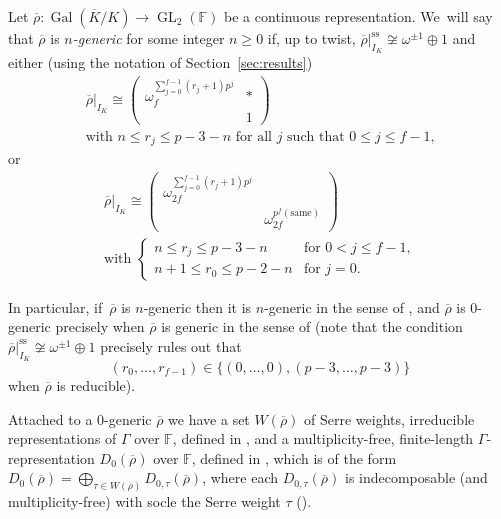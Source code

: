 \documentclass[JEP,XML,SOM,Unicode,NoFloatCountersInSection, NoEqCountersInSection,published]{cedram}
\let\ovl\overline
\newcommand{\F}{\mathbb{F}}
\renewcommand{\ss}{\mathrm{ss}}
\newcommand{\rhobar}{\overline{\rho}}
\newcommand{\brho}{\overline{\rho}}
\DeclareMathOperator{\Gal}{Gal}
\DeclareMathOperator{\GL}{GL}
\theoremstyle{plain}
\theoremstyle{definition}
\begin{document}
Let $\brho:\Gal(\ovl K/K)\to \GL_2(\F)$ be a continuous representation. We~will say that $\rhobar$ is \emph{$n$-generic} for some integer $n \ge 0$ if, up to twist, $\rhobar|_{I_K}^{\ss}\not\cong \omega^{\pm 1}\oplus 1$ and either (using the notation of Section~\ref{sec:results})\vspace*{-3pt}
\begin{multline}\label{eq:rhobar-generic-red}
\rhobar|_{I_K} \cong \begin{pmatrix}\omega_f^{\sum_{j=0}^{f-1} (r_j+1) p^j} & * \\ & 1\end{pmatrix}\\
\text{with $n \leq r_j \leq p-3-n$ for all $j$ such that $0 \le j \le f-1$,}
\end{multline}
or\vspace*{-3pt}
\begin{multline}\label{eq:rhobar-generic-irred}
\rhobar|_{I_K} \cong \begin{pmatrix}\omega_{2f}^{\sum_{j=0}^{f-1} (r_j+1) p^j} & \\ & \omega_{2f}^{p^f(\text{same})}\end{pmatrix} \\ \text{with\ }
\begin{cases}
n \leq r_j \leq p-3-n &\text{for $0 < j \le f-1$,} \\ n+1 \leq r_0 \leq p-2-n & \text{for $j = 0$.}
\end{cases}
\end{multline}

In particular, if~$\rhobar$ is $n$-generic then it is $n$-generic in the sense of \cite[Def.\,2.3.4]{BHHMS1}, and $\rhobar$ is $0$-generic precisely when $\rhobar$ is generic in the sense of \cite[Def.\,11.7]{BP} (note that the condition $\rhobar|_{I_K}^{\ss}\not\cong \omega^{\pm 1}\oplus 1$ precisely rules out that\vspace*{-3pt}
\[
(r_0,\dots,r_{f-1})\in\{(0,\dots,0),(p-3,\dots,p-3)\}
\]
when $\rhobar$ is reducible).

Attached to a $0$-generic $\rhobar$ we have a set $W(\rhobar)$ of Serre weights, \ie irreducible representations of $\Gamma$ over $\F$, defined in \cite[\S 3]{BDJ}, and a multiplicity-free, finite-length $\Gamma$-representation $D_0(\rhobar)$ over $\F$, defined in \cite[\S 13]{BP}, which is of the form $D_0(\rhobar)=\bigoplus_{\tau\in W(\rhobar)}D_{0,\tau}(\rhobar)$, where each $D_{0,\tau}(\rhobar)$ is indecomposable (and multiplicity-free) with socle the Serre weight $\tau$ (\cite[\S 15]{BP}).
\end{document}
